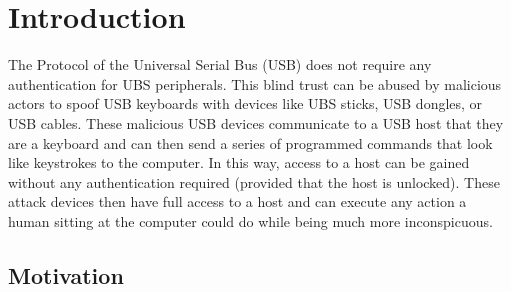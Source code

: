 \chapter{Introduction}

The Protocol of the Universal Serial Bus (USB) does not require any authentication for UBS peripherals. This blind trust can be abused by malicious actors to spoof USB keyboards with devices like UBS sticks, USB dongles, or USB cables. These malicious USB devices communicate to a USB host that they are a keyboard and can then send a series of programmed commands that look like keystrokes to the computer. In this way, access to a host can be gained without any authentication required (provided that the host is unlocked). These attack devices then have full access to a host and can execute any action a human sitting at the computer could do while being much more inconspicuous. 




\section{Motivation}

